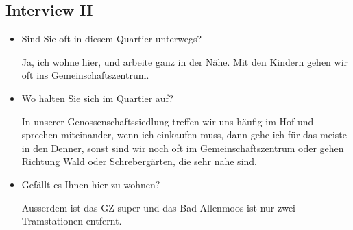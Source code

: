 \documentclass[a4paper,ngerman,11pt]{scrartcl}
\begin{document}
\subsection*{Interview II}
\label{sec-2-2}

\begin{itemize}
\item Sind Sie oft in diesem Quartier unterwegs?

Ja, ich wohne hier, und arbeite ganz in der Nähe. Mit den Kindern gehen wir
oft ins Gemeinschaftszentrum.

\item Wo halten Sie sich im Quartier auf?

In unserer Genossenschaftssiedlung treffen wir uns häufig im Hof und
sprechen miteinander, wenn ich einkaufen muss, dann gehe ich für das meiste
in den Denner, sonst sind wir noch oft im Gemeinschaftszentrum oder gehen
Richtung Wald oder Schrebergärten, die sehr nahe sind.

\item Gefällt es Ihnen hier zu wohnen?

Ausserdem ist das GZ super und das Bad Allenmoos ist nur zwei Tramstationen
entfernt.
\end{itemize}
\end{document}
